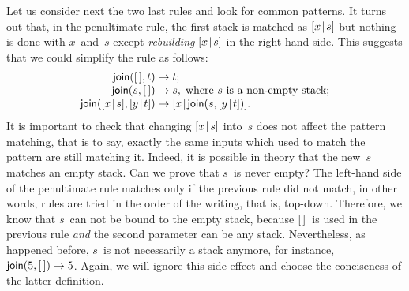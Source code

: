 Let us consider next the two last rules and look for common
patterns. It turns out that, in the penultimate rule, the first stack
is matched as \([{x}\!\mid\!{s}]\) but nothing is done with \(x\)~and~\(s\)
except \emph{rebuilding} \([{x}\!\mid\!{s}]\) in the right\hyp{}hand
side. This suggests that we could simplify the rule as follows:
\begin{equation*}
\begin{array}{r@{\;}l@{\;}l}
\fun{join}(\el,t) & \rightarrow & t;\\
\fun{join}(s,\el) & \rightarrow & s,\;
  \text{where \(s\) is a non-empty stack};\\
\fun{join}(\cons{x}{s},\cons{y}{t}) & \rightarrow &
  \cons{x}{\fun{join}(s,\cons{y}{t})}.
\end{array}
\end{equation*}
It is important to check that changing \([{x}\!\mid\!{s}]\) into~\(s\) does
not affect the pattern matching, that is to say, exactly the same
inputs which used to match the pattern are still matching it. Indeed,
it is possible in theory that the new~\(s\) matches an empty
stack. Can we prove that \(s\)~is never empty? The left\hyp{}hand side
of the penultimate rule matches only if the previous rule did not
match, in other words, rules are tried in the order of the writing,
that is, top\hyp{}down. Therefore, we know that \(s\)~can not be bound
to the empty stack, because \([\,]\)~is used in the previous rule
\emph{and} the second parameter can be any stack. Nevertheless, as
happened before, \(s\)~is not necessarily a stack anymore, for
instance, \(\textsf{join}(5,[\,]) \rightarrow 5\). Again, we will ignore
this side\hyp{}effect and choose the conciseness of the latter
definition.

